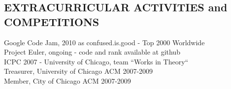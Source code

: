 \documentclass{res}
\begin{document}
\begin{resume}
 
\section{EXTRACURRICULAR ACTIVITIES and COMPETITIONS}
    Google Code Jam, 2010 as confused.is.good - Top 2000 Worldwide \\
    Project Euler, ongoing - code and rank available at github \\
    ICPC 2007 - University of Chicago, team ``Works in Theory`` \\
    Treasurer, University of Chicago ACM 2007-2009 \\         
    Member, City of Chicago ACM 2007-2009
 
\end{resume}
\end{document}
